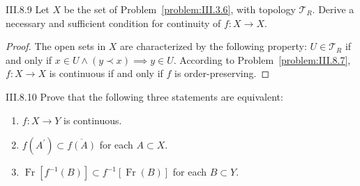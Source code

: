 \begin{problem}{III.8.9}
Let \( X \) be the set of Problem~\ref{problem:III.3.6}, with topology \( \mathscr{T}_{R} \). Derive a necessary and sufficient condition for continuity of \( f: X \to X \).
\end{problem}

\begin{proof}
	The open sets in \( X \) are characterized by the following property: \( U \in \mathscr{T}_{R} \) if and only if \( x \in U \land (y \prec x) \implies y \in U \). According to Problem~\ref{problem:III.8.7}, \( f: X \to X \) is continuous if and only if \( f \) is order-preserving.
\end{proof}

\begin{problem}{III.8.10}
Prove that the following three statements are equivalent:
\begin{enumerate}[label={(\alph*)}]
	\item \( f: X \to Y \) is continuous.
	\item \( f(A^{\prime}) \subset \overline{f(A)} \) for each \( A \subset X \).
	\item \( \operatorname{Fr}\left\lbrack f^{-1}(B) \right\rbrack \subset f^{-1}\left\lbrack \operatorname{Fr}(B) \right\rbrack \) for each \( B \subset Y \).
\end{enumerate}
\end{problem}

